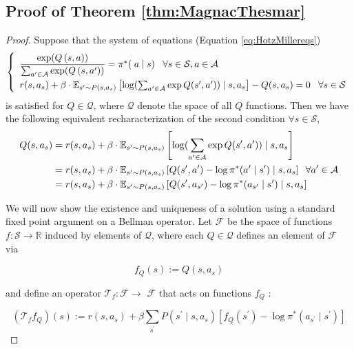 \subsection{Proof of Theorem \ref{thm:MagnacThesmar}}\label{sec:PfMagnac}
\begin{proof}
    Suppose that the system of equations (Equation \ref{eq:HotzMillereqs})
\begin{equation}
\left\{
\begin{array}{l}
    \dfrac{\exp({Q}\left(s,a\right))}{\sum_{a^\prime\in \mathcal{A}} \exp({Q}\left(s,a^\prime\right))} = \pi^*(\;a
    \mid s) \; \; \; \forall s\in \mathcal{S}, a\in\mathcal{A}
    \\[1em]
    r(s, a_s)+\beta \cdot \mathbb{E}_{s^{\prime} \sim P(s, a_s)}\left[\log(\sum_{a^\prime\in\mathcal{A}}\exp Q(s^\prime, a^\prime)) \mid s, a_s\right]-Q(s, a_s)=0 \;\; \; \forall s\in \mathcal{S} 
\end{array}
\right.
\notag
\end{equation} 
is satisfied for $Q\in \mathcal{Q}$, where $\mathcal{Q}$ denote the space of all $Q$ functions. Then we have the following equivalent recharacterization of the second condition $\forall s\in \mathcal{S}$,
\begin{align}
     Q(s, a_s)&=r(s, a_s)+\beta \cdot \mathbb{E}_{s^{\prime} \sim P(s, a_s)}\left[\log(\sum_{a^\prime\in\mathcal{A}}\exp Q(s^\prime, a^\prime)) \mid s, a_s\right]\;\; \; \notag
     \\
     &=  r(s, a_s)+\beta \cdot \mathbb{E}_{s^\prime \sim P(s, a_s)}\left[Q(s^\prime, a^\prime) - \log \pi^*(a^\prime \mid s^\prime) \mid s, a_s\right] \;\; \forall a^\prime\in\mathcal{A} \notag
     \\
     &=  r(s, a_s)+\beta \cdot \mathbb{E}_{s^\prime \sim P(s, a_s)}\left[Q(s^\prime, a_{s^\prime}) - \log \pi^*(a_{s^\prime} \mid s^\prime) \mid s, a_s\right]
\end{align}

We will now show the existence and uniqueness of a solution using a standard fixed point argument on a Bellman operator. Let $\mathcal{F}$ be the space of functions $f: \mathcal{S} \rightarrow \mathbb{R}$ induced by elements of $\mathcal{Q}$, where each $Q \in \mathcal{Q}$ defines an element of $\mathcal{F}$ via

$$
f_Q(s):=Q\left(s, a_s\right)
$$

and define an operator $\mathcal{T}_f: \mathcal{F} \rightarrow$ $\mathcal{F}$ that acts on functions $f_Q$ :

$$
\left(\mathcal{T}_f f_Q\right)(s):=r\left(s, a_s\right)+\beta \sum_{s^{\prime}} P\left(s^{\prime} \mid s, a_s\right)\left[f_Q\left(s^{\prime}\right)-\log \pi^*\left(a_{s^{\prime}} \mid s^{\prime}\right)\right]
$$


\end{proof}
